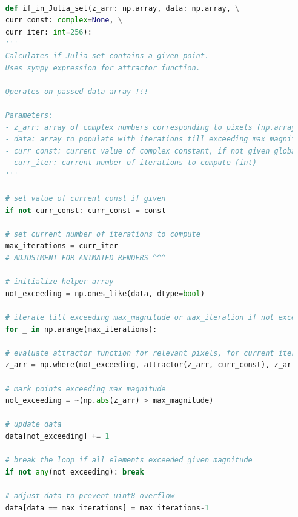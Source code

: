 \documentclass{article}
\begin{document}

\begin{lstlisting}[language=Python, caption=Another adjustment to if\_in\_Julia\_set unction]
	
	def if_in_Julia_set(z_arr: np.array, data: np.array, \
	curr_const: complex=None, \
	curr_iter: int=256):
	'''
	Calculates if Julia set contains a given point.
	Uses sympy expression for attractor function.
	
	Operates on passed data array !!!
	
	Parameters:
	- z_arr: array of complex numbers corresponding to pixels (np.array)
	- data: array to populate with iterations till exceeding max_magnitude or max_iteration if not exceeded (np.array)
	- curr_const: current value of complex constant, if not given global const value will be utilized (complex)
	- curr_iter: current number of iterations to compute (int)
	'''
	
	# set value of current const if given
	if not curr_const: curr_const = const
	
	# set current number of iterations to compute
	max_iterations = curr_iter
	# ADJUSTMENT FOR ANIMATED RENDERS ^^^
	
	# initialize helper array
	not_exceeding = np.ones_like(data, dtype=bool)
	
	# iterate till exceeding max_magnitude or max_iteration if not exceeded 
	for _ in np.arange(max_iterations):
	
	# evaluate attractor function for relevant pixels, for current iteration
	z_arr = np.where(not_exceeding, attractor(z_arr, curr_const), z_arr)
	
	# mark points exceeding max_magnitude
	not_exceeding = ~(np.abs(z_arr) > max_magnitude)
	
	# update data
	data[not_exceeding] += 1
	
	# break the loop if all elements exceeded given magnitude
	if not any(not_exceeding): break
	
	# adjust data to prevent uint8 overflow
	data[data == max_iterations] = max_iterations-1
	
\end{lstlisting}
\pagebreak

\end{document}
